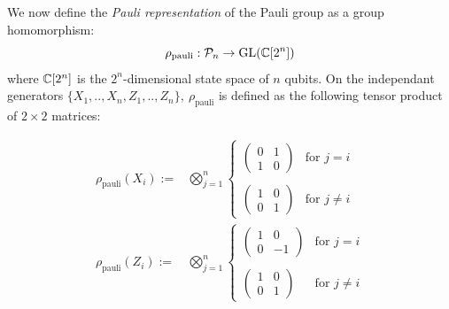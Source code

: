 \documentclass[12pt]{article}
\begin{document}
We now define the
{\it Pauli representation} 
of the Pauli group as a group homomorphism:
$$
    \rho_{\mathrm{pauli}} : \mathcal{P}_n \to \mathrm{GL}(\mathbb{C}[2^n])
$$
where $\mathbb{C}[2^n]$ is the $2^n$-dimensional state space of $n$ qubits.
On the independant generators 
$\{X_1, .., X_n, Z_1, .., Z_n\},\ \rho_{\mathrm{pauli}}$
is defined as the following tensor product of $2\times 2$ matrices:


\begin{align*}
\rho_{\mathrm{pauli}}(X_i) := &\bigotimes_{j=1}^n \left\{ \begin{array}{ll}
\left( \begin{array}{ll}
0&1\\
1&0\end{array} \right) &\mbox{for $j=i$}\\
\\
\left( \begin{array}{ll}
1&0\\
0&1\end{array} \right) &\mbox{for $j\ne i$} \end{array}
\right.\\
\rho_{\mathrm{pauli}}(Z_i) := &\bigotimes_{j=1}^n \left\{ \begin{array}{ll}
\left( \begin{array}{ll}
1&0\\
0&-1\end{array} \right) &\mbox{for $j=i$}\\
\\
\left( \begin{array}{rr}
1&0\\
0&1\end{array} \right) &\mbox{for $j\ne i$}\end{array}
\right.
\end{align*}
\end{document}
